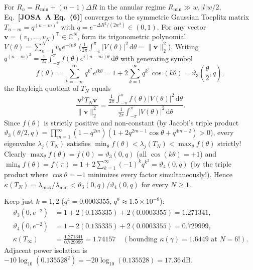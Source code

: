 \documentclass[10pt,letterpaper]{article}
\newcommand{\norm}[1]{\lVert #1 \rVert}
\newcommand{\abs}[1]{\lvert #1 \rvert}
\newcommand{\dd}{\mathrm{d}}
\newcommand{\josa}[1]{\textbf{[JOSA~A Eq.~(#1)]}}
\numberwithin{equation}{section}
\begin{document}
For $R_n = R_{\min} + (n-1)\Delta R$ in the annular regime $R_{\min} \gg w, \abs{l}w/2$, Eq.~\josa{6} converges to the symmetric Gaussian Toeplitz matrix $T_{n-m} = q^{(n-m)^2}$ with $q = e^{-\Delta R^2/(2w^2)} \in (0,1)$. For any vector $\mathbf{v} = (v_1,\dots,v_N)^{\mathsf{T}} \in \mathbb{C}^N$, form its trigonometric polynomial $V(\theta) = \sum_{n=1}^N v_n e^{-in\theta}$ ($\frac{1}{2\pi}\int_{-\pi}^\pi \abs{V(\theta)}^2\,\dd\theta = \norm{\mathbf{v}}_2^2$). Writing $q^{(n-m)^2} = \frac{1}{2\pi}\int_{-\pi}^\pi f(\theta) e^{i(n-m)\theta}\,\dd\theta$ with generating symbol
\begin{equation}
  f(\theta) = \sum_{k=-\infty}^\infty q^{k^2} e^{ik\theta} = 1 + 2\sum_{k=1}^\infty q^{k^2}\cos(k\theta) = \vartheta_3\!\left(\frac{\theta}{2}, q\right),
\end{equation}
the Rayleigh quotient of $T_N$ equals
\begin{equation}
  \frac{\mathbf{v}^\dagger T_N \mathbf{v}}{\norm{\mathbf{v}}_2^2} = \frac{\frac{1}{2\pi}\int_{-\pi}^\pi f(\theta)\abs{V(\theta)}^2\,\dd\theta}{\frac{1}{2\pi}\int_{-\pi}^\pi \abs{V(\theta)}^2\,\dd\theta}.
\end{equation}
Since $f(\theta)$ is strictly positive and non-constant (by Jacobi's triple product $\vartheta_3(\theta/2,q) = \prod_{m=1}^\infty (1-q^{2m})(1+2q^{2m-1}\cos\theta + q^{4m-2}) > 0$), every eigenvalue $\lambda_j(T_N)$ satisfies $\min_\theta f(\theta) < \lambda_j(T_N) < \max_\theta f(\theta)$ strictly! Clearly $\max_\theta f(\theta) = f(0) = \vartheta_3(0,q)$ (all $\cos(k\theta) = +1$) and $\min_\theta f(\theta) = f(\pi) = 1 + 2\sum_{k=1}^\infty (-1)^k q^{k^2} = \vartheta_4(0,q)$ (by the triple product where $\cos\theta = -1$ minimizes every factor simultaneously!). Hence $\kappa(T_N) = \lambda_{\max}/\lambda_{\min} < \vartheta_3(0,q)/\vartheta_4(0,q)$ for every $N \ge 1$.

\begin{pencheck}[Hand Arithmetic at $\Delta R = 2.0\,w$ ($q = e^{-2} = 0.135335$)]
Keep just $k = 1, 2$ ($q^4 = 0.0003355$, $q^9 \approx 1.5\times 10^{-8}$):
\begin{align*}
  \vartheta_3(0,e^{-2}) &= 1 + 2(0.135335) + 2(0.0003355) = 1.271341, \\
  \vartheta_4(0,e^{-2}) &= 1 - 2(0.135335) + 2(0.0003355) = 0.729999, \\
  \kappa(T_\infty) &= \frac{1.271341}{0.729999} = \mathbf{1.74157}\quad (\text{bounding }\kappa(\gamma) = 1.6449\text{ at }N=6!).
\end{align*}
Adjacent power isolation is $-10\log_{10}(0.135528^2) = -20\log_{10}(0.135528) = \mathbf{17.36\,\mathrm{dB}}$.
\end{pencheck}
\end{document}
